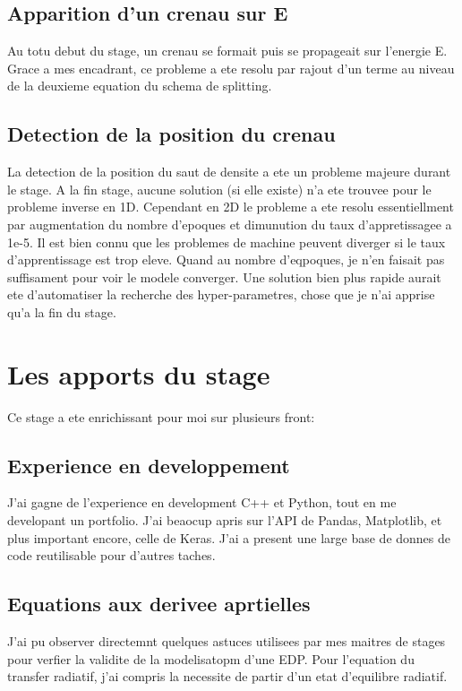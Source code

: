 \subsection{Apparition d'un crenau sur E}
Au totu debut du stage, un crenau se formait puis se propageait sur l'energie E. Grace a mes encadrant, ce probleme a ete resolu par rajout d'un terme au niveau de la deuxieme equation du schema de splitting.

\subsection{Detection de la position du crenau}
La detection de la position du saut de densite a ete un probleme majeure durant le stage. A la fin stage, aucune solution (si elle existe) n'a ete trouvee pour le probleme inverse en 1D. 
Cependant en 2D le probleme a ete resolu essentiellment par augmentation du nombre d'epoques et dimunution du taux d'appretissagee a 1e-5. Il est bien connu que les problemes de machine peuvent diverger si le taux d'apprentissage est trop eleve. Quand au nombre d'eqpoques, je n'en faisait pas suffisament pour voir le modele converger. Une solution bien plus rapide aurait ete d'automatiser la recherche des hyper-parametres, chose que je n'ai apprise qu'a la fin du stage.



\section{Les apports du stage}

Ce stage a ete enrichissant pour moi sur plusieurs front:

\subsection{Experience en developpement}
J'ai gagne de l'experience en development C++ et Python, tout en me developant un portfolio. J'ai beaocup apris sur l'API de Pandas, Matplotlib, et plus important encore, celle de Keras. J'ai a present une large base de donnes de code reutilisable pour d'autres taches.

\subsection{Equations aux derivee aprtielles}
J'ai pu observer directemnt quelques astuces utilisees par mes maitres de stages pour verfier la validite de la modelisatopm d'une EDP. Pour l'equation du transfer radiatif, j'ai compris la necessite de partir d'un etat d'equilibre radiatif.

